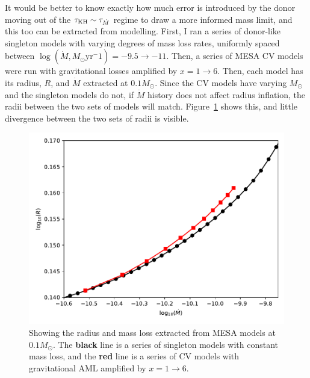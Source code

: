 It would be better to know exactly how much error is introduced by the donor moving out of the $\tau_{\rm KH} \sim \tau_{\dot M}$ regime to draw a more informed mass limit, and this too can be extracted from modelling.
First, I ran a series of donor-like singleton models with varying degrees of mass loss rates, uniformly spaced between $\log (\dot M, M_\odot \mathrm{yr}^-1) = -9.5 \rightarrow -11$.
Then, a series of MESA CV models were run with gravitational losses amplified by $x = 1 \rightarrow 6$.
Then, each model has its radius, $R$, and $\dot M$ extracted at $0.1 M_\odot$. Since the CV models have varying $M_\odot$ and the singleton models do not, if $\dot M$ history does not affect radius inflation, the radii between the two sets of models will match. Figure~\ref{fig:modelling:comparing radii at 0.1Msun} shows this, and little divergence between the two sets of radii is visible.
\begin{figure}
    \centering
    \includegraphics[width=\textwidth]{figures/modelling/compare_0.1Msun_with_CV_track_K11_fig1.pdf}
    \caption{Showing the radius and mass loss extracted from MESA models at $0.1 M_\odot$. The {\bf black} line is a series of singleton models with constant mass loss, and the {\bf red} line is a series of CV models with gravitational AML amplified by $x = 1 \rightarrow 6$.}
    \label{fig:modelling:comparing radii at 0.1Msun}
\end{figure}

